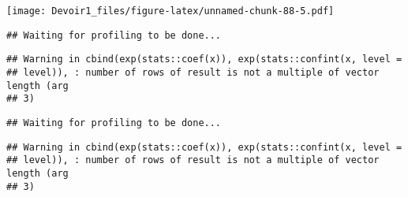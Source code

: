 \documentclass[]{article}
\newenvironment{Shaded}{\begin{snugshade}}{\end{snugshade}}
\newcommand{\KeywordTok}[1]{\textcolor[rgb]{0.13,0.29,0.53}{\textbf{#1}}}
\newcommand{\DataTypeTok}[1]{\textcolor[rgb]{0.13,0.29,0.53}{#1}}
\newcommand{\DecValTok}[1]{\textcolor[rgb]{0.00,0.00,0.81}{#1}}
\newcommand{\StringTok}[1]{\textcolor[rgb]{0.31,0.60,0.02}{#1}}
\newcommand{\OperatorTok}[1]{\textcolor[rgb]{0.81,0.36,0.00}{\textbf{#1}}}
\newcommand{\NormalTok}[1]{#1}
\begin{document}
\texttt{[image: Devoir1\_files/figure-latex/unnamed-chunk-88-5.pdf]}

\begin{Shaded}
\end{Shaded}

\begin{verbatim}
## Waiting for profiling to be done...
\end{verbatim}

\begin{verbatim}
## Warning in cbind(exp(stats::coef(x)), exp(stats::confint(x, level =
## level)), : number of rows of result is not a multiple of vector length (arg
## 3)
\end{verbatim}

\begin{verbatim}
## Waiting for profiling to be done...
\end{verbatim}

\begin{verbatim}
## Warning in cbind(exp(stats::coef(x)), exp(stats::confint(x, level =
## level)), : number of rows of result is not a multiple of vector length (arg
## 3)
\end{verbatim}
\end{document}
